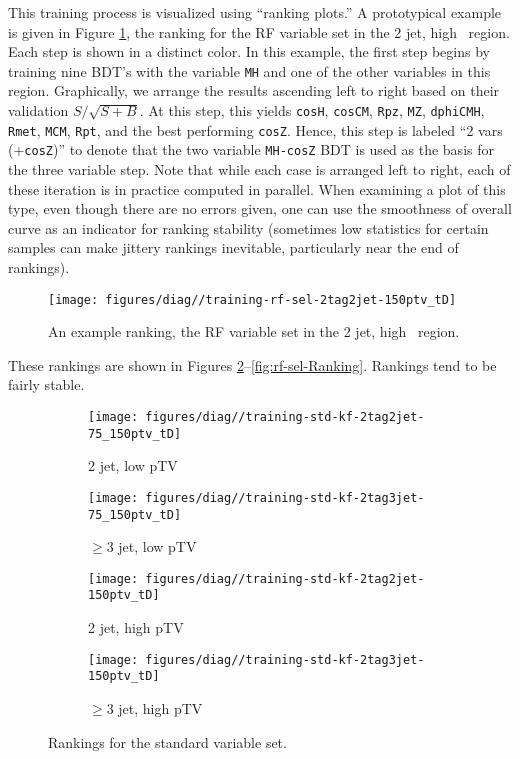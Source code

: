 This training process is visualized using ``ranking plots.''  A prototypical example is given in Figure \ref{fig:rankeg}, the ranking for the  RF variable set in the 2 jet, high \ptv\ region.  Each step is shown in a distinct color.  In this example, the first step begins by training nine BDT's with the variable \texttt{MH} and one of the other variables in this region.  Graphically, we arrange the results ascending left to right based on their validation $S/\sqrt{S+B}$.  At this step, this yields \texttt{cosH}, \texttt{cosCM}, \texttt{Rpz}, \texttt{MZ}, \texttt{dphiCMH}, \texttt{Rmet}, \texttt{MCM}, \texttt{Rpt}, and the best performing \texttt{cosZ}.  Hence, this step is labeled ``2 vars (+\texttt{cosZ})'' to denote that the two variable \texttt{MH-cosZ} BDT is used as the basis for the three variable step.  Note that while each case is arranged left to right, each of these iteration is in practice computed in parallel.  When examining a plot of this type, even though there are no errors given, one can use the smoothness of overall curve as an indicator for ranking stability (sometimes low statistics for certain samples can make jittery rankings inevitable, particularly near the end of rankings).
\begin{landscape}
\begin{figure}[!htbp]\captionsetup{justification=centering}
  \centering
  \texttt{[image: figures/diag//training-rf-sel-2tag2jet-150ptv\_tD]}
  \caption{An example ranking, the RF variable set in the 2 jet, high \ptv\ region.}
  \label{fig:rankeg}
\end{figure}
\end{landscape}

These rankings are shown in Figures \ref{fig:std-kf-Ranking}--\ref{fig:rf-sel-Ranking}.  Rankings tend to be fairly stable.

\begin{figure}[!htbp]\captionsetup{justification=centering}
  \centering
\begin{subfigure}[t]{0.49\textwidth}\centering\texttt{[image: figures/diag//training-std-kf-2tag2jet-75\_150ptv\_tD]}\caption{2 jet, low pTV}\end{subfigure}
\begin{subfigure}[t]{0.49\textwidth}\centering\texttt{[image: figures/diag//training-std-kf-2tag3jet-75\_150ptv\_tD]}\caption{$\ge3$ jet, low pTV}\end{subfigure}
\begin{subfigure}[t]{0.49\textwidth}\centering\texttt{[image: figures/diag//training-std-kf-2tag2jet-150ptv\_tD]}\caption{2 jet, high pTV}\end{subfigure}
\begin{subfigure}[t]{0.49\textwidth}\centering\texttt{[image: figures/diag//training-std-kf-2tag3jet-150ptv\_tD]}\caption{$\ge3$ jet, high pTV}\end{subfigure}
  \caption{Rankings for the standard variable set.}
  \label{fig:std-kf-Ranking}
\end{figure}

